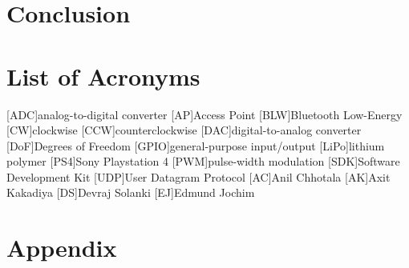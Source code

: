\documentclass[a4paper, 12pt,titlepage,openany]{report}
\begin{document}
	\chapter{Conclusion}
	\label{ch:Conclusion}
	
	
	
	\chapter*{List of Acronyms}
	\label{sec:Acro}
	\begin{acronym}[SDK]
		[ADC]{analog-to-digital converter}
		[AP]{Access Point}
		[BLW]{Bluetooth Low-Energy}
		[CW]{clockwise}
		[CCW]{counterclockwise}
		[DAC]{digital-to-analog converter}
		[DoF]{Degrees of Freedom}
		{general-purpose input/output}
		{lithium polymer}
		[PS4]{Sony Playstation 4}
		[PWM]{pulse-width modulation}
		[SDK]{Software Development Kit}
		[UDP]{User Datagram Protocol}
		[AC]{Anil Chhotala}
		[AK]{Axit Kakadiya}
		[DS]{Devraj Solanki}
		[EJ]{Edmund Jochim}
	\end{acronym}
	
	\clearpage
	\setcounter{page}{5}
	
	\chapter*{Appendix}
	
	
	
	
\end{document}
